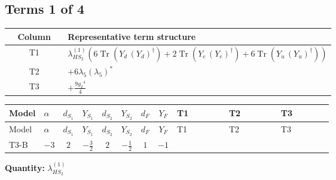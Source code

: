 \documentclass[8pt]{article}
\begin{document}
\begin{landscape}
\subsection*{Terms 1 of 4}
\begin{center}
\begin{tabular}{@{}c >{\raggedright\arraybackslash}p{0.82\linewidth}@{}}
\toprule
Column & Representative term structure \\
\midrule
T1 & \(\displaystyle {\lambda_{HS_2}^{(1)}} (6 \operatorname{Tr}\!\left({Y_d}\,\left({Y_d}\right)^{\dagger}\right)+2 \operatorname{Tr}\!\left({Y_e}\,\left({Y_e}\right)^{\dagger}\right)+6 \operatorname{Tr}\!\left({Y_u}\,\left({Y_u}\right)^{\dagger}\right))\) \\
\midrule
T2 & \(\displaystyle +6 {\lambda_5} \left({\lambda_5}\right)^{*}\) \\
\midrule
T3 & \(\displaystyle +\frac{9 {g_2}^4}{4}\) \\
\midrule
\bottomrule
\end{tabular}
\end{center}
\smallskip
\tiny
\begin{longtable}{@{}llcccccc >{\raggedright\arraybackslash}p{0.21\linewidth} >{\raggedright\arraybackslash}p{0.21\linewidth} >{\raggedright\arraybackslash}p{0.21\linewidth}@{}}
\toprule
Model & $\alpha$ & $d_{S_1}$ & $Y_{S_1}$ & $d_{S_2}$ & $Y_{S_2}$ & $d_F$ & $Y_F$ & T1 & T2 & T3 \\
\midrule
\endfirsthead
\toprule
Model & $\alpha$ & $d_{S_1}$ & $Y_{S_1}$ & $d_{S_2}$ & $Y_{S_2}$ & $d_F$ & $Y_F$ & T1 & T2 & T3 \\
\midrule
\endhead
T3-B & $-3$ & $2$ & $-\frac{3}{2}$ & $2$ & $-\frac{1}{2}$ & $1$ & $-1$ & \scriptsize\adjustbox{max width=\linewidth}{$\begin{gathered} {\lambda_{HS_2}^{(1)}} (6 \operatorname{Tr}\!\left({Y_d}\,\left({Y_d}\right)^{\dagger}\right)+2 \operatorname{Tr}\!\left({Y_e}\,\left({Y_e}\right)^{\dagger}\right)+6 \operatorname{Tr}\!\left({Y_u}\,\left({Y_u}\right)^{\dagger}\right))\end{gathered}$} & \scriptsize\adjustbox{max width=\linewidth}{$\begin{gathered} +6 {\lambda_5} \left({\lambda_5}\right)^{*}\end{gathered}$} & \scriptsize\adjustbox{max width=\linewidth}{$\begin{gathered} +\frac{9 {g_2}^4}{4}\end{gathered}$} \\
\midrule
\bottomrule
\end{longtable}
\clearpage
\noindent\textbf{Quantity: }$\lambda_{HS_2}^{(1)}$\par\smallskip

\end{landscape}
\end{document}
